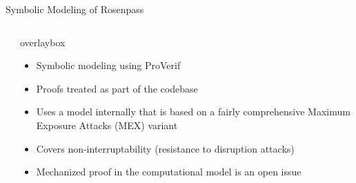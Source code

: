 \begin{frame}{Symbolic Modeling of Rosenpass}
  \begin{columns}[c]
    \begin{column}{.5\linewidth}
    \end{column}%
    \begin{column}{.5\linewidth}
    \begin{beamercolorbox}[colsep*=1ex,ht=\dimeval{\defaultframetextheight+2pt}]{overlaybox}
      \begin{itemize}
        \item Symbolic modeling using ProVerif
        \item Proofs treated as part of the codebase
        \item Uses a model internally that is based on a fairly comprehensive Maximum Exposure Attacks (MEX) variant
        \item Covers non-interruptability (resistance to disruption attacks)
        \item Mechanized proof in the computational model is an open issue
      \end{itemize}
  \end{beamercolorbox}
    \end{column}
  \end{columns}
\end{frame}





